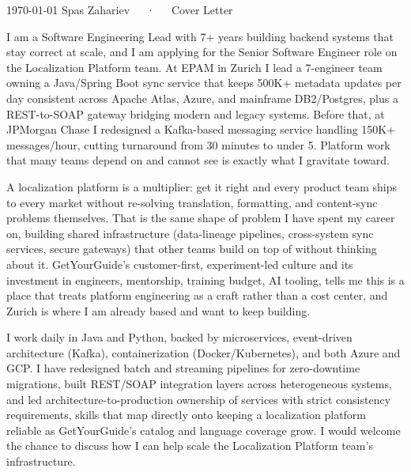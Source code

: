 \documentclass[11pt, a4paper]{awesome-cv}
\begin{document}
\makecvheader[R]

\makecvfooter
  {\today}
  {Spas Zahariev~~~·~~~Cover Letter}
  {}

\makelettertitle

\begin{cvletter}

I am a Software Engineering Lead with 7+ years building backend systems that stay correct at scale, and I am applying for the Senior Software Engineer role on the Localization Platform team. At EPAM in Zurich I lead a 7-engineer team owning a Java/Spring Boot sync service that keeps 500K+ metadata updates per day consistent across Apache Atlas, Azure, and mainframe DB2/Postgres, plus a REST-to-SOAP gateway bridging modern and legacy systems. Before that, at JPMorgan Chase I redesigned a Kafka-based messaging service handling 150K+ messages/hour, cutting turnaround from 30 minutes to under 5. Platform work that many teams depend on and cannot see is exactly what I gravitate toward.

A localization platform is a multiplier: get it right and every product team ships to every market without re-solving translation, formatting, and content-sync problems themselves. That is the same shape of problem I have spent my career on, building shared infrastructure (data-lineage pipelines, cross-system sync services, secure gateways) that other teams build on top of without thinking about it. GetYourGuide's customer-first, experiment-led culture and its investment in engineers, mentorship, training budget, AI tooling, tells me this is a place that treats platform engineering as a craft rather than a cost center, and Zurich is where I am already based and want to keep building.

I work daily in Java and Python, backed by microservices, event-driven architecture (Kafka), containerization (Docker/Kubernetes), and both Azure and GCP. I have redesigned batch and streaming pipelines for zero-downtime migrations, built REST/SOAP integration layers across heterogeneous systems, and led architecture-to-production ownership of services with strict consistency requirements, skills that map directly onto keeping a localization platform reliable as GetYourGuide's catalog and language coverage grow. I would welcome the chance to discuss how I can help scale the Localization Platform team's infrastructure.

\end{cvletter}


\makeletterclosing
\end{document}
